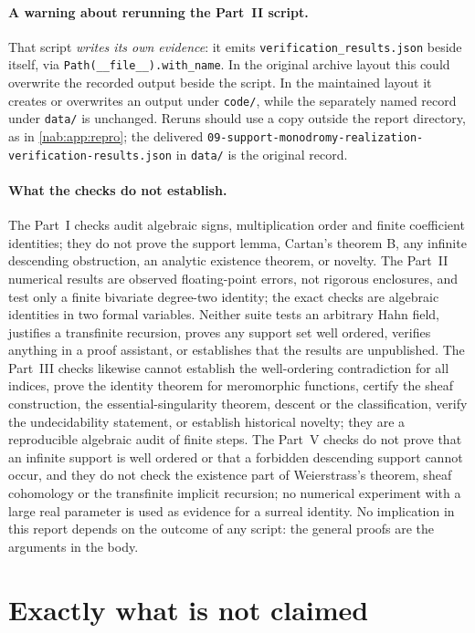 \documentclass[11pt,letterpaper]{article}
\theoremstyle{definition}
\theoremstyle{remark}
\numberwithin{equation}{section}
\begin{document}
\paragraph{A warning about rerunning the Part~II script.}
That script \emph{writes its own evidence}: it emits
\texttt{verification\_results.json} beside itself, via
\texttt{Path(\_\_file\_\_).with\_name}. In the original archive layout this
could overwrite the recorded output beside the script. In the maintained
layout it creates or overwrites an output under \texttt{code/}, while the
separately named record under \texttt{data/} is unchanged. Reruns should use a
copy outside the report directory, as in \cref{nab:app:repro}; the delivered
\texttt{09-support-monodromy-realization-verification-results.json} in
\texttt{data/} is the original record.

\paragraph{What the checks do not establish.}
The Part~I checks audit algebraic signs, multiplication order and finite
coefficient identities; they do not prove the support lemma, Cartan's theorem
B, any infinite descending obstruction, an analytic existence theorem, or
novelty. The Part~II numerical results are observed floating-point errors, not
rigorous enclosures, and test only a finite bivariate degree-two identity; the
exact checks are algebraic identities in two formal variables. Neither suite
tests an arbitrary Hahn field, justifies a transfinite recursion, proves any
support set well ordered, verifies anything in a proof assistant, or
establishes that the results are unpublished. The Part~III checks likewise
cannot establish the well-ordering contradiction for all indices, prove the
identity theorem for meromorphic functions, certify the sheaf construction,
the essential-singularity theorem, descent or the classification, verify the
undecidability statement, or establish historical novelty; they are a
reproducible algebraic audit of finite steps. The Part~V checks do not prove
that an infinite support is well ordered or that a forbidden descending support
cannot occur, and they do not check the existence part of Weierstrass's
theorem, sheaf cohomology or the transfinite implicit recursion; no numerical
experiment with a large real parameter is used as evidence for a surreal
identity. No implication in this report depends on the outcome of any script:
the general proofs are the arguments in the body.

\section{Exactly what is not claimed}\label{nab:sec:scope}
\end{document}
